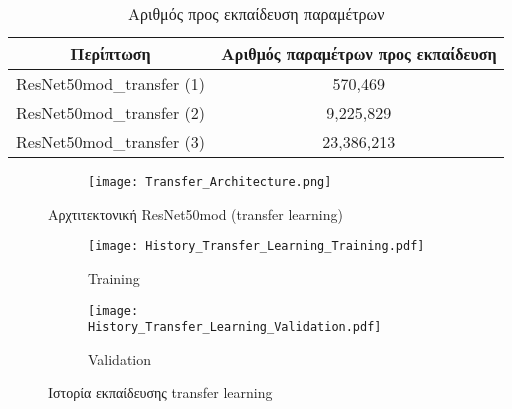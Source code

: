 \begin{table}[H]
\centering
\begin{tabular}{|c|c|}
\hline
Περίπτωση                 & Αριθμός παραμέτρων προς εκπαίδευση \\ \hline
ResNet50mod\_transfer (1) & 570,469                            \\ \hline
ResNet50mod\_transfer (2) & 9,225,829                          \\ \hline
ResNet50mod\_transfer (3) & 23,386,213                         \\ \hline
\end{tabular}
\caption{Αριθμός προς εκπαίδευση παραμέτρων}
\label{parameters_transfer_table}
\end{table}


\begin{figure}[H]
\centering
\begin{subfigure}[t]{1.0\textwidth}%
\texttt{[image: Transfer\_Architecture.png]}
\end{subfigure}
\caption{Αρχτιτεκτονική ResNet50mod (transfer learning)}
\label{transfer_learning_fig}
\end{figure}



\begin{figure}[H]
\centering
\begin{subfigure}[t]{1.0\textwidth}
\texttt{[image: History\_Transfer\_Learning\_Training.pdf]}
\caption{Training}
\label{image_transfer_training}
\end{subfigure}
\begin{subfigure}[t]{1.0\textwidth}
\texttt{[image: History\_Transfer\_Learning\_Validation.pdf]}
\caption{Validation}
\label{image_transfer_validation}
\end{subfigure}
\caption{Ιστορία εκπαίδευσης transfer learning}
\label{Training_History_Transfer}
\end{figure}



